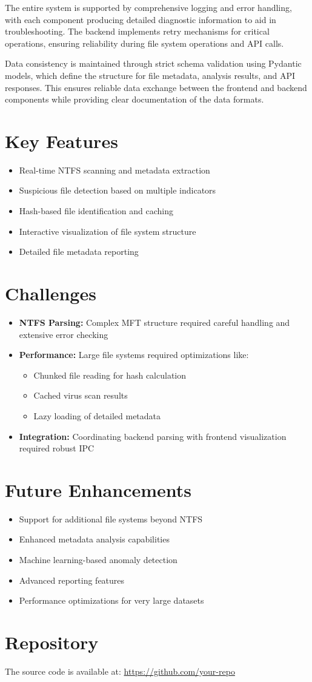 \documentclass[a4paper,12pt]{article}
\begin{document}
The entire system is supported by comprehensive logging and error handling, with each component producing detailed diagnostic information to aid in troubleshooting. The backend implements retry mechanisms for critical operations, ensuring reliability during file system operations and API calls.

Data consistency is maintained through strict schema validation using Pydantic models, which define the structure for file metadata, analysis results, and API responses. This ensures reliable data exchange between the frontend and backend components while providing clear documentation of the data formats.
\section*{Key Features}
\begin{itemize}
    \item Real-time NTFS scanning and metadata extraction
    \item Suspicious file detection based on multiple indicators
    \item Hash-based file identification and caching
    \item Interactive visualization of file system structure
    \item Detailed file metadata reporting
\end{itemize}

\section*{Challenges}
\begin{itemize}
    \item \textbf{NTFS Parsing:} Complex MFT structure required careful handling and extensive error checking
    \item \textbf{Performance:} Large file systems required optimizations like:
    \begin{itemize}
        \item Chunked file reading for hash calculation
        \item Cached virus scan results
        \item Lazy loading of detailed metadata
    \end{itemize}
    \item \textbf{Integration:} Coordinating backend parsing with frontend visualization required robust IPC
\end{itemize}

\section*{Future Enhancements}
\begin{itemize}
    \item Support for additional file systems beyond NTFS
    \item Enhanced metadata analysis capabilities
    \item Machine learning-based anomaly detection
    \item Advanced reporting features
    \item Performance optimizations for very large datasets
\end{itemize}

\section*{Repository}
The source code is available at: \href{https://github.com/your-repo}{https://github.com/your-repo}
\end{document}
